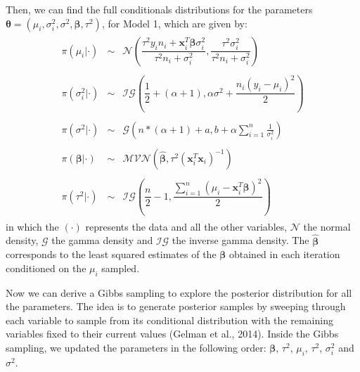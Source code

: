 \documentclass{asaproc}
\begin{document}
Then, we can find the full conditionals distributions for the parameters $\boldsymbol{\theta} = (\mu_i, \sigma^2_i, \sigma^2, \boldsymbol{\beta}, \tau^2)$, for Model 1, which are given by:
\begin{eqnarray*}
\begin{array}{rcl}
\pi(\mu_i|\cdot) & \sim & \mathcal{N}\left( \dfrac{\tau^2 y_i n_i + \textbf{x}^T_i\boldsymbol{\beta}\sigma^2_i}{\tau^2 n_i +\sigma_i^2}, \dfrac{\tau^2\sigma_i^2}{\tau^2 n_i + \sigma_i^2} \right) \\ \\

\pi(\sigma^2_i|\cdot) & \sim & \mathcal{IG}\left( \dfrac{1}{2} + (\alpha + 1), \alpha \sigma^2 + \dfrac{n_i ( y_i - \mu_i)^2}{2} \right) \\ \\

\pi(\sigma^2|\cdot) & \sim & \mathcal{G}\left( n*(\alpha + 1)+a, b + \alpha\sum_{i=1}^{n}\frac{1}{\sigma_i^2}\right) \\ \\


\pi(\boldsymbol{\beta}|\cdot) & \sim & \mathcal{MVN}\left( \hat{\boldsymbol{\beta}}, \tau^2 (\textbf{x}^T_i\textbf{x}_i)^{-1} \right) \\ \\

\pi(\tau^2|\cdot) & \sim & \mathcal{IG}\left(  \dfrac{n}{2} - 1, \dfrac{\sum_{i=1}^{n} (\mu_i - \textbf{x}^T_i\boldsymbol{\beta})^2}{2} \right) 
\end{array}
\end{eqnarray*}
\noindent
in which the $(\cdot)$ represents the data and all the other variables, $\mathcal{N}$ the normal density, $\mathcal{G}$ the gamma density and $\mathcal{IG}$ the inverse gamma density. The $\hat{\boldsymbol{\beta}}$ corresponds to the least squared estimates of the $\boldsymbol{\beta}$ obtained in each iteration conditioned on the $\mu_i$ sampled.

Now we can derive a Gibbs sampling to explore the posterior distribution for all the parameters. The idea is to generate posterior samples by sweeping through each variable to sample from its conditional distribution with the remaining variables fixed to their current values (Gelman et al., 2014). Inside the Gibbs sampling, we updated the parameters in the following order: $\boldsymbol{\beta}$, $\tau^2$, $\mu_i$, $\tau^2$, $\sigma_i^2$ and $\sigma^2$.
\end{document}
